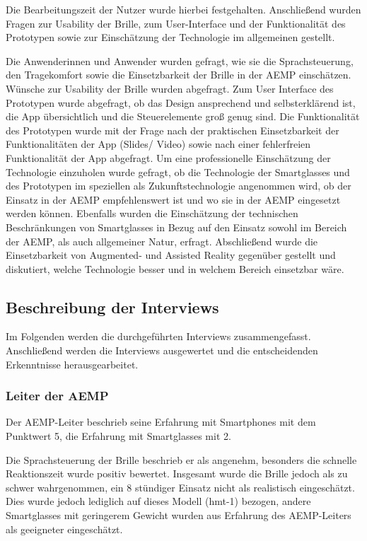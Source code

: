 Die Bearbeitungszeit der Nutzer wurde hierbei festgehalten. Anschließend wurden Fragen zur Usability der Brille, zum User-Interface und der Funktionalität des Prototypen sowie zur Einschätzung der Technologie im allgemeinen gestellt.

Die Anwenderinnen und Anwender wurden gefragt, wie sie die Sprachsteuerung, den Tragekomfort sowie die Einsetzbarkeit der Brille in der AEMP einschätzen. Wünsche zur Usability der Brille wurden abgefragt. Zum User Interface des Prototypen wurde abgefragt, ob das Design ansprechend und selbsterklärend ist, die App übersichtlich und die Steuerelemente groß genug sind. Die Funktionalität des Prototypen wurde mit der Frage nach der praktischen Einsetzbarkeit der Funktionalitäten der App (Slides/ Video) sowie nach einer fehlerfreien Funktionalität der App abgefragt. Um eine professionelle Einschätzung der Technologie einzuholen wurde gefragt, ob die Technologie der Smartglasses und des Prototypen im speziellen als Zukunftstechnologie angenommen wird, ob der Einsatz in der AEMP empfehlenswert ist und wo sie in der AEMP eingesetzt werden können. Ebenfalls wurden die Einschätzung der technischen Beschränkungen von Smartglasses in Bezug auf den Einsatz sowohl im Bereich der AEMP, als auch allgemeiner Natur, erfragt. Abschließend wurde die Einsetzbarkeit von Augmented- und Assisted Reality gegenüber gestellt und diskutiert, welche Technologie besser und in welchem Bereich einsetzbar wäre.
%
%
%
%
%
%
%
\subsection{Beschreibung der Interviews}
\label{sec:Beschreinung_der_Interviews}
Im Folgenden werden die durchgeführten Interviews zusammengefasst. Anschließend werden die Interviews ausgewertet und die entscheidenden Erkenntnisse herausgearbeitet.
%
%
\subsubsection{Leiter der AEMP}
%
Der AEMP-Leiter beschrieb seine Erfahrung mit Smartphones mit dem Punktwert 5, die Erfahrung mit Smartglasses mit 2.

Die Sprachsteuerung der Brille beschrieb er als angenehm, besonders die schnelle Reaktionszeit wurde positiv bewertet. Insgesamt wurde die Brille jedoch als zu schwer wahrgenommen, ein 8 stündiger Einsatz nicht als realistisch eingeschätzt. Dies wurde jedoch lediglich auf dieses Modell (hmt-1) bezogen, andere Smartglasses mit geringerem Gewicht wurden aus Erfahrung des AEMP-Leiters als geeigneter eingeschätzt.

